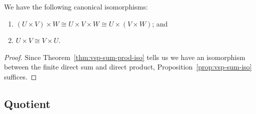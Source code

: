 \begin{proposition}
    We have the following canonical isomorphisms:
    \begin{enumerate}[label={(\alph*)}, itemsep=0mm]
        \item \((U \times V) \times W \cong U \times V \times W \cong U \times (V \times W)\); and
        \item \(U \times V \cong V \times U\).
    \end{enumerate}
\end{proposition}
\begin{proof}
    Since Theorem~\ref{thm:vsp-sum-prod-iso} tells us we have an isomorphism
    between the finite direct sum and direct product,
    Proposition~\ref{prop:vsp-sum-iso} suffices.
\end{proof}


\subsection*{Quotient}

